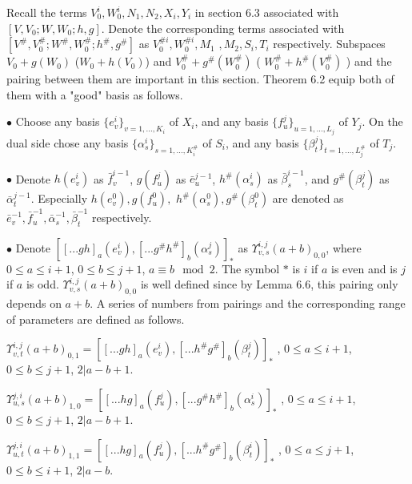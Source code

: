\def\CTEXPreproc{Created by ctex v0.2.12, don't edit!}\documentclass[11pt]{article}
\begin{document}
 Recall the terms  $V^i _0 , W^i _0 , N_1 , N_2 , X_i , Y_i $ in section 6.3 associated with  $[V,V_0 ; W, W_0 ; h,g  ]$. Denote the corresponding terms associated with $[V^{\#}, V^{\#}_0 ; W^{\#}, W^{\#}_0 ; h^{\#} ,g^{\#}  ] $ as
  $V^{\# i} _0 , W^{\# i} _0 , M_1
  $ $, M_2 , S_i , T_i   $ respectively. Subspaces $V_0 +g(W_0 )$ ($W_0 + h(V_0 ) $) and $V^{\#}_0 +g^{\#}(W^{\#}_0 )$
  ( $W^{\#}_0 +h^{\#}(V^{\#}_0 )$  ) and the pairing between them are important in this section. Theorem 6.2 equip both  of them with a "good" basis as follows.

\noindent $\bullet$ Choose any basis $\{ e^i _{v} \}_{v=1,..., K_i } $ of $X_i $, and any basis
$\{ f^j _{u} \}_{u=1,...,L_j}   $ of $Y_j$. On the dual side chose any basis $\{  \alpha^i _s \}_{s=1,..., K^{\#}_i } $ of $S_i$, and any basis
$\{ \beta^j _{t} \}_{t=1,...,L^{\#}_j }  $ of $T_j$.

\noindent $\bullet$ Denote $h( e^i _{v}  ) $ as $ \bar{f}^{i-1} _{v}  $, $g(  f^j _{u} ) $ as $\bar{e}^{j-1} _u $, $ h^{\#}(\alpha^i _{s})  $ as $\bar{\beta}^{i-1} _{s}$,
 and $ g^{\#} ( \beta^j _{t}  )  $ as $\bar{\alpha}^{j-1} _t $. Especially $h( e^0 _{v}  ) , g(f^0 _u ) ,$
  $ h^{\#}(\alpha^0 _s ), g^{\#}(\beta^0 _{t})  $ are denoted as $\bar{e}^{-1}_v , \bar{f}^{-1}_u , \bar{\alpha}^{-1}_s , \bar{\beta}^{-1}_t   $ respectively.

\noindent $\bullet$ Denote $[ [...gh]_{a}( e^i _v  )  , [...g^{\#} h^{\#} ]_{b}( \alpha^j _s )    ]_{*}   $ as $\Upsilon^{i,j}_{v,s}(a+b)_{0,0} $, where $0\leq a\leq i+1 $, $0\leq b\leq j+1$, $a\equiv b \mod 2 $. The symbol $*$ is $i$ if $a$ is even and is $j$ if $a$ is odd. $\Upsilon^{i,j}_{v,s}(a+b)_{0,0} $ is well defined since by Lemma 6.6, this pairing only depends on $a+b$. A series of numbers from pairings and the corresponding range of parameters are defined as follows.

\noindent$\Upsilon^{i,j}_{v,t}(a+b)_{0,1} = [ [...gh]_{a}( e^i _v  )  , [...h^{\#} g^{\#} ]_{b}( \beta^j _t )    ]_{*}   $  ,  $0\leq a\leq i+1 $, $0\leq b\leq j+1$, $2|a-b+1$.

\noindent $\Upsilon^{j,i}_{u,s}(a+b)_{1,0} =[ [...hg]_{a}( f^j _u )  , [...g^{\#} h^{\#} ]_{b}( \alpha^i _s )    ]_{*}   $ ,  $0\leq a\leq i+1 $, $0\leq b\leq j+1$, $2|a-b+1 $.

\noindent$\Upsilon^{j,i}_{u,t}(a+b)_{1,1} = [ [...hg]_{a}( f^j _u )  , [...h^{\#} g^{\#} ]_{b}( \beta^i  _t )    ]_{*}   $ ,  $0\leq a\leq j+1 $, $0\leq b\leq i+1$, $2|a-b $.\\
\end{document}
